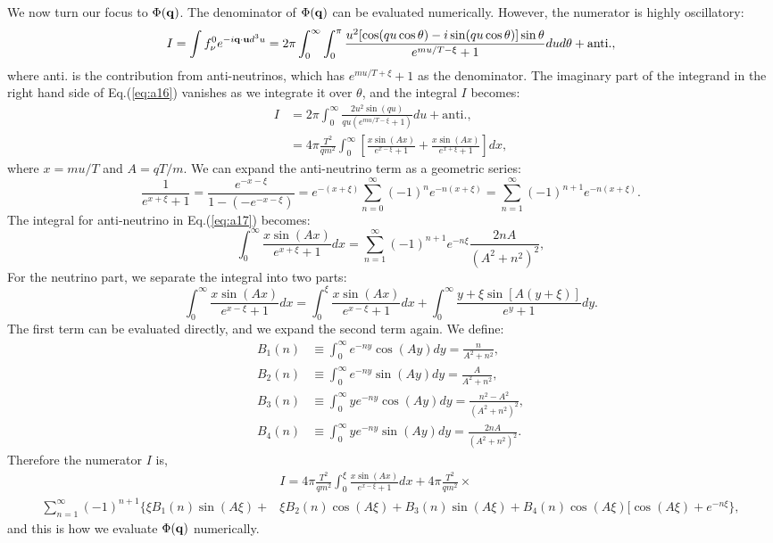 We now turn our focus to $\Phi(\bold q)$. The denominator of $\Phi(\bold q)$ can be evaluated numerically. However, the numerator is highly oscillatory:
\begin{equation}
\label{eq:a16}
    I =\int f^0_\nu e^{-i \bold q \cdot \bold u d^3u} = 2\pi \int^\infty_0\int^\pi_0 \frac{u^2 [\cos(qu \cos\theta)-i \sin(qu\cos \theta)]\sin\theta}{e^{mu/T-\xi} +1} du d\theta + \mathrm{anti.},
\end{equation}
where anti. is the contribution from anti-neutrinos, which has $e^{mu/T+\xi} +1$ as the denominator. The imaginary part of the integrand in the right hand side of Eq.(\ref{eq:a16}) vanishes as we integrate it over $\theta$, and the integral $I$ becomes:
\begin{align}
    I &= 2\pi \int^\infty_0 \frac{2u^2 \sin(qu)}{qu(e^{mu/T-\xi} +1)} du + \mathrm{anti.} \nonumber ,\\
\label{eq:a17}
    &=4\pi \frac{T^2}{qm^2} \int^\infty_0 \left[\frac{x \sin(Ax)}{e^{x-\xi} +1 } + \frac{x \sin(Ax)}{e^{x+\xi} +1 }\right] dx,
\end{align}
where $x=mu/T$ and $A=qT/m$. We can expand the anti-neutrino term as a geometric series:
\begin{equation}
    \frac{1}{e^{x+\xi}+1}= \frac{e^{-x-\xi}}{1-(-e^{-x-\xi})} = e^{-(x+\xi)} \sum_{n=0}^\infty (-1)^n e^{-n(x+\xi)} = \sum_{n=1}^\infty (-1)^{n+1} e^{-n(x+\xi)}.
\end{equation}
The integral for anti-neutrino in Eq.(\ref{eq:a17}) becomes:
\begin{equation}
    \int^\infty_0 \frac{x \sin(Ax)}{e^{x+\xi} +1 } dx = \sum_{n=1}^\infty (-1)^{n+1} e^{-n\xi} \frac{2nA}{(A^2+n^2)^2},
\end{equation}
For the neutrino part, we separate the integral into two parts:
\begin{equation}
    \int^\infty_0 \frac{x \sin(Ax)}{e^{x-\xi} +1 } dx = \int^\xi_0 \frac{x \sin(Ax)}{e^{x-\xi} +1 } dx + \int^\infty_0 \frac{y+\xi \sin[A(y+\xi)]}{e^{y} +1 } dy.
\end{equation}
The first term can be evaluated directly, and we expand the second term again. We define:
\begin{align}
    B_1(n) &\equiv \int^\infty_0 e^{-ny} \cos(Ay) dy = \frac{n}{A^2+n^2}\nonumber, \\
    B_2(n) &\equiv \int^\infty_0 e^{-ny} \sin(Ay) dy = \frac{A}{A^2 + n^2}\nonumber, \\
    B_3(n) &\equiv \int^\infty_0 ye^{-ny} \cos(Ay) dy = \frac{n^2-A^2}{(A^2+n^2)^2} , \\
    B_4(n) &\equiv \int^\infty_0 ye^{-ny} \sin(Ay) dy = \frac{2nA}{(A^2+n^2)^2}\nonumber.
\end{align}
Therefore the numerator $I$ is,
\begin{equation}
\begin{split}
    &I = 4\pi \frac{T^2}{qm^2}\int^\xi_0 \frac{x \sin(Ax)}{e^{x-\xi} +1 } dx + 4\pi \frac{T^2}{qm^2} \times \\ 
    \sum_{n=1}^\infty (-1)^{n+1} \{ \xi B_1(n)\sin(A\xi)+&\xi B_2(n)\cos(A\xi)+B_3(n)\sin(A\xi)+B_4(n)\cos(A\xi)[\cos(A\xi)+e^{-n\xi}\},
\end{split}
\end{equation}
and this is how we evaluate $\Phi(\bold q)$ numerically.
